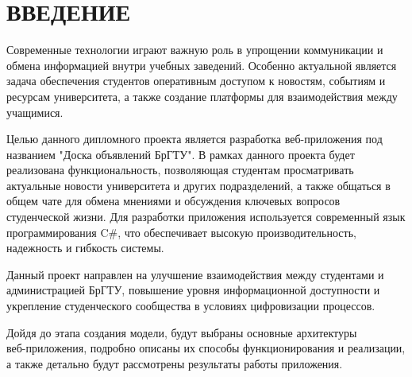 \sectionbreak \section*{ 
	\gostTitleFont
	\redline
	ВВЕДЕНИЕ
}

\subtitlespace

{\gostFont
	
	\par \redline Современные технологии играют важную роль в упрощении коммуникации и обмена информацией внутри учебных заведений. Особенно актуальной является задача обеспечения студентов оперативным доступом к новостям, событиям и ресурсам университета, а также создание платформы для взаимодействия между учащимися. 
	
	\par \redline Целью данного дипломного проекта является разработка веб-приложения под названием "Доска объявлений БрГТУ". В рамках данного проекта будет реализована функциональность, позволяющая студентам просматривать актуальные новости университета и других подразделений, а также общаться в общем чате для обмена мнениями и обсуждения ключевых вопросов студенческой жизни. Для разработки приложения используется современный язык программирования C\#, что обеспечивает высокую производительность, надежность и гибкость системы. 
	
	\par \redline Данный проект направлен на улучшение взаимодействия между студентами и администрацией БрГТУ, повышение уровня информационной доступности и укрепление студенческого сообщества в условиях цифровизации процессов.
	
	\par \redline Дойдя до этапа создания модели, будут выбраны основные архитектуры \\веб-приложения, подробно описаны их способы функционирования и реализации, а также детально будут рассмотрены результаты работы приложения.
	
	\par
}
